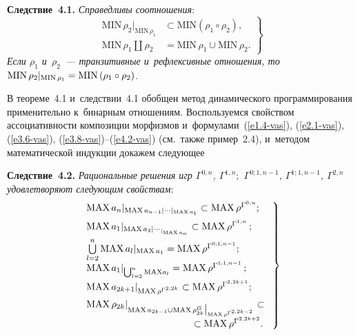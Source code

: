 \begin{multicols}{2}
    \noindent
    \textbf{Следствие~4.1.} \textit{Справедливы соотношения}:
    \begin{equation}
    \left.
    \begin{array}{rl}
   \mathrm{MIN}\,\rho_2\vert_{\mathrm{MIN}\,\rho_1} &\subset \mathrm{MIN}\left( \rho_1\circ\rho_2\right),\\[6pt]
    \mathrm{MIN}\,\rho_1 \displaystyle \coprod \rho_2 &=\mathrm{MIN}\,\rho_1\cup \mathrm{MIN}\,\rho_2.
     \end{array}
     \right\}
    \label{e4.2-vas}
    \end{equation}
 \textit{Если $\rho_1$ и~$\rho_2$~--- транзитивные и~рефлексивные отношения, то} 
$\mathrm{MIN}\,\rho_2\vert_{\mathrm{MIN}\,\rho_1} \hm= \mathrm{MIN}\,(\rho_1\circ\rho_2)$.
    
    \smallskip
    
    В теореме~4.1 и~следствии~4.1 обобщен метод динамического 
программирования применительно к~бинарным отношениям. Воспользуемся 
свойством ас\-со\-циа\-тив\-ности композиции морфизмов и~формулами~(\ref{e1.4-vas}), 
(\ref{e2.1-vas}), (\ref{e3.6-vas}), (\ref{e3.8-vas})--(\ref{e4.2-vas}) (см.\ 
также пример~2.4), и~методом математической индукции докажем сле\-ду\-ющее 
    
    \smallskip
    
    \noindent
    \textbf{Следствие~4.2.} \textit{Рациональные решения игр $\Gamma^{0,n}$, 
$\Gamma^{1,n};$ $\Gamma^{0;1,n-1}$, $\Gamma^{1;1,n-1}$, $\Gamma^{2,n}$ 
удовле\-тво\-ря\-ют сле\-ду\-ющим свойствам}:
    \begin{equation}
    \left.
    \begin{array}{l}
    \mathrm{MAX}\, a_n\vert_{\mathrm{MAX}\, a_{n-1}\vert\cdots \vert_{\mathrm{MAX} \,a_1}} \subset \mathrm{MAX}\, 
\rho^{\Gamma^{0,n}};\\[6pt]
 \mathrm{MAX} \,a_1\vert_{\mathrm{MAX} \,a_2\vert\cdots {}_{\vert_{\mathrm{MAX}\, a_n}}}\subset 
\mathrm{MAX} \,\rho^{\Gamma^{1,n}}\,;\\[6pt]
    \mathop{\bigcup}\limits^n_{l=2} \mathrm{MAX} \,a_l\vert_{\mathrm{MAX} \,a_1} = \mathrm{MAX} \,\rho^{\Gamma^{0; 1,n-1}}; \\[6pt]
 \mathrm{MAX}\, a_1\vert_{\mathop{\bigcup}_{l=2}^n \mathrm{MAX} a_l} =\mathrm{MAX} \,\rho^{\Gamma^{1;1,n-1}}\,;\\[6pt]
    \mathrm{MAX} \,a_{2k+1}\vert_{\mathrm{MAX}\, \rho^{\Gamma^{2,2k}}} \subset \mathrm{MAX}\,\rho^{\Gamma^{2,2k+1}};\\[6pt]
 \mathrm{MAX}\,\rho_{2k}\vert_{\mathrm{MAX}\, a_{2k-1} \cup \mathrm{MAX}\,\rho^G_{2k}\big\vert_{\mathrm{MAX}\, \rho^{\Gamma^{2,2k-2}}}} \subset{}\\[6pt]
\hspace*{38mm}{}\subset \mathrm{MAX}\,  \rho^{\Gamma^{2,2k+2}}.
\end{array}
\right\}
\label{e4.3-vas}
    \end{equation}


\end{multicols}

